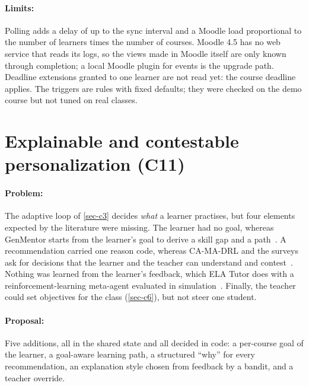 \paragraph{Limits:} Polling adds a delay of up to the sync interval and a
Moodle load proportional to the number of learners times the number of
courses. Moodle 4.5 has no web service that reads its logs, so the views
made in Moodle itself are only known through completion; a local Moodle
plugin for events is the upgrade path. Deadline
extensions granted to one learner are not read yet: the course deadline
applies. The triggers are rules with fixed defaults; they were checked on
the demo course but not tuned on real classes.

\section[Explainable and contestable personalization]{Explainable and contestable personalization (C11)}
\label{sec-c11}

\paragraph{Problem:} The adaptive loop of \cref{sec-c3} decides
\emph{what} a learner practises, but four elements expected by the
literature were missing. The learner had no goal, whereas GenMentor starts
from the learner's goal to derive a skill gap and a
path~\cite{wang2025genmentor}. A recommendation carried one reason code,
whereas CA-MA-DRL and the surveys ask for decisions that the learner and
the teacher can understand and contest~\cite{sharif2026camadrl}. Nothing
was learned from the learner's feedback, which ELA Tutor does with a
reinforcement-learning meta-agent evaluated in
simulation~\cite{lopezgoyez2026ela}. Finally, the teacher could set
objectives for the class (\cref{sec-c6}), but not steer one student.

\paragraph{Proposal:} Five additions, all in the shared state and all
decided in code: a per-course goal of the learner, a goal-aware learning
path, a structured ``why'' for every recommendation, an explanation style
chosen from feedback by a bandit, and a teacher override.


